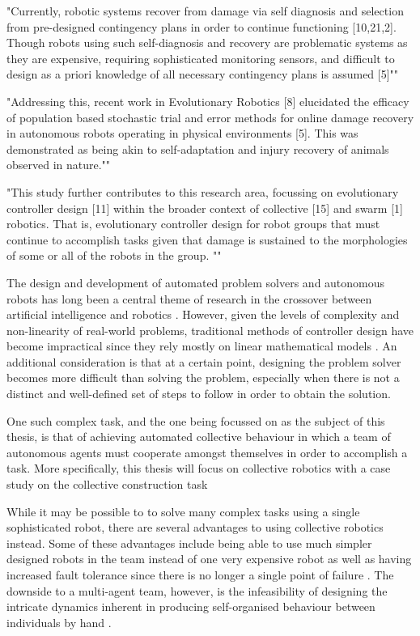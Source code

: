 "Currently, robotic systems recover from damage via self diagnosis and selection from pre-designed contingency plans in order to continue functioning [10,21,2]. Though robots using such self-diagnosis and recovery are problematic systems as they are expensive, requiring sophisticated monitoring sensors, and difficult to design as a priori knowledge of all necessary contingency plans is assumed [5]""

"Addressing this, recent work in Evolutionary Robotics [8] elucidated the efficacy of population based stochastic trial and error methods for online damage recovery in autonomous robots operating in physical environments [5]. This was demonstrated as being akin to self-adaptation and injury recovery of animals observed in nature.""

"This study further contributes to this research area, focussing on evolutionary controller design [11] within the broader context of collective [15] and swarm [1] robotics. That is, evolutionary controller design for robot groups that must continue to accomplish tasks given that damage is sustained to the morphologies of some or all of the robots in the group. ""




The design and development of automated problem solvers and autonomous robots has long been a central theme of research in the crossover between artificial intelligence and robotics \cite{RefWorks:33}. However, given the levels of complexity and non-linearity of real-world problems, traditional methods of controller design have become impractical since they rely mostly on linear mathematical models \cite{RefWorks:32}. An additional consideration is that at a certain point, designing the problem solver becomes more difficult than solving the problem, especially when there is not a distinct and well-defined set of steps to follow in order to obtain the solution.

One such complex task, and the one being focussed on as the subject of this thesis, is that of achieving automated collective behaviour in which a team of autonomous agents must cooperate amongst themselves in order to accomplish a task. More specifically, this thesis will focus on collective robotics with a case study on the collective construction task

While it may be possible to to solve many complex tasks using a single sophisticated robot, there are several advantages to using collective robotics instead. Some of these advantages include being able to use much simpler designed robots in the team instead of one very expensive robot as well as having increased fault tolerance since there is no longer a single point of failure \cite{chaimowicz2001architecture}. The downside to a multi-agent team, however, is the infeasibility of designing the intricate dynamics inherent in producing self-organised behaviour between individuals by hand \cite{RefWorks:11}.

